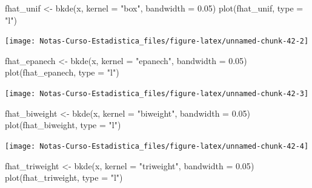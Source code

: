 \documentclass[
  12pt,
]{book}
\newenvironment{Shaded}{\begin{snugshade}}{\end{snugshade}}
\newcommand{\AttributeTok}[1]{\textcolor[rgb]{0.77,0.63,0.00}{#1}}
\newcommand{\FloatTok}[1]{\textcolor[rgb]{0.00,0.00,0.81}{#1}}
\newcommand{\FunctionTok}[1]{\textcolor[rgb]{0.00,0.00,0.00}{#1}}
\newcommand{\NormalTok}[1]{#1}
\newcommand{\OtherTok}[1]{\textcolor[rgb]{0.56,0.35,0.01}{#1}}
\newcommand{\StringTok}[1]{\textcolor[rgb]{0.31,0.60,0.02}{#1}}
\theoremstyle{definition}
\theoremstyle{definition}
\theoremstyle{definition}
\theoremstyle{remark}
\begin{document}
\begin{Shaded}
\begin{Highlighting}[]
\NormalTok{fhat\_unif }\OtherTok{\textless{}{-}} \FunctionTok{bkde}\NormalTok{(x, }\AttributeTok{kernel =} \StringTok{"box"}\NormalTok{, }\AttributeTok{bandwidth =} \FloatTok{0.05}\NormalTok{)}
\FunctionTok{plot}\NormalTok{(fhat\_unif, }\AttributeTok{type =} \StringTok{"l"}\NormalTok{)}
\end{Highlighting}
\end{Shaded}

\begin{center}\texttt{[image: Notas-Curso-Estadistica\_files/figure-latex/unnamed-chunk-42-2]} \end{center}

\begin{Shaded}
\begin{Highlighting}[]
\NormalTok{fhat\_epanech }\OtherTok{\textless{}{-}} \FunctionTok{bkde}\NormalTok{(x, }\AttributeTok{kernel =} \StringTok{"epanech"}\NormalTok{, }\AttributeTok{bandwidth =} \FloatTok{0.05}\NormalTok{)}
\FunctionTok{plot}\NormalTok{(fhat\_epanech, }\AttributeTok{type =} \StringTok{"l"}\NormalTok{)}
\end{Highlighting}
\end{Shaded}

\begin{center}\texttt{[image: Notas-Curso-Estadistica\_files/figure-latex/unnamed-chunk-42-3]} \end{center}

\begin{Shaded}
\begin{Highlighting}[]
\NormalTok{fhat\_biweight }\OtherTok{\textless{}{-}} \FunctionTok{bkde}\NormalTok{(x, }\AttributeTok{kernel =} \StringTok{"biweight"}\NormalTok{, }\AttributeTok{bandwidth =} \FloatTok{0.05}\NormalTok{)}
\FunctionTok{plot}\NormalTok{(fhat\_biweight, }\AttributeTok{type =} \StringTok{"l"}\NormalTok{)}
\end{Highlighting}
\end{Shaded}

\begin{center}\texttt{[image: Notas-Curso-Estadistica\_files/figure-latex/unnamed-chunk-42-4]} \end{center}

\begin{Shaded}
\begin{Highlighting}[]
\NormalTok{fhat\_triweight }\OtherTok{\textless{}{-}} \FunctionTok{bkde}\NormalTok{(x, }\AttributeTok{kernel =} \StringTok{"triweight"}\NormalTok{, }\AttributeTok{bandwidth =} \FloatTok{0.05}\NormalTok{)}
\FunctionTok{plot}\NormalTok{(fhat\_triweight, }\AttributeTok{type =} \StringTok{"l"}\NormalTok{)}
\end{Highlighting}
\end{Shaded}
\end{document}

